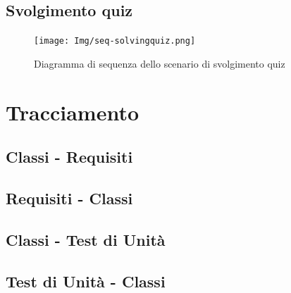 \documentclass[a4paper, titlepage]{article}
\begin{document}
	\subsection{Svolgimento quiz}
	\begin{figure}[!h]
		\centering
		\texttt{[image: Img/seq-solvingquiz.png]}
		\caption{Diagramma di sequenza dello scenario di svolgimento quiz}
	\end{figure}

\newpage
\appendix
\section{Tracciamento}

\subsection{Classi - Requisiti}


\subsection{Requisiti - Classi}


\subsection{Classi - Test di Unità}


\subsection{Test di Unità - Classi}

\end{document}
